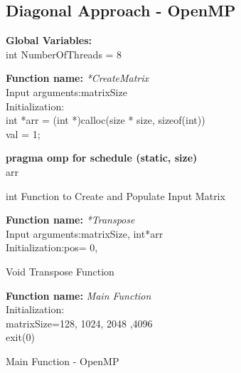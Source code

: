 \documentclass[10pt,journal]{article}
\begin{document}
\newpage
\subsection{Diagonal Approach - OpenMP}
\textbf{Global Variables:} \\
int NumberOfThreads = 8\\

\begin{algorithm}[H]
\SetAlgoLined
\textbf{Function name:} \emph{*CreateMatrix}\\
Input arguments:\:matrixSize\\
Initialization\::\\
int *arr = (int *)calloc(size * size, sizeof(int))\\
val = 1;

\vspace{10pt} 
\textbf{pragma omp for schedule (static, size)}\\
\Return arr
\caption{int Function to Create and Populate Input Matrix}
\end{algorithm}

\begin{algorithm}[H]
\SetAlgoLined
\textbf{Function name:} \emph{*Transpose}\\
Input arguments:\:matrixSize, int*arr\\
Initialization\::pos= 0,\\

\vspace{10pt} 
\caption{Void Transpose Function}
\end{algorithm}

\begin{algorithm}[H]
\SetAlgoLined
\textbf{Function name:} \emph{Main Function}\\
Initialization\::\\
matrixSize={128, 1024, 2048 ,4096}\\

\vspace{10pt} 
 exit(0)
\caption{Main Function - OpenMP}
\end{algorithm}
\end{document}
